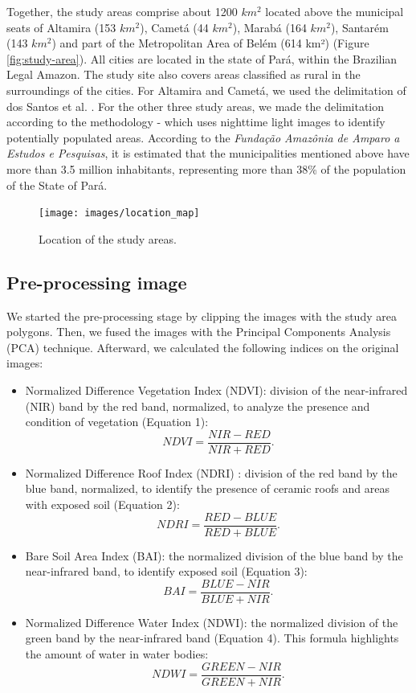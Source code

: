 \documentclass[preprint, 3p,
authoryear]{elsarticle} %
\providecommand{\tightlist}{%
  \setlength{\itemsep}{0pt}\setlength{\parskip}{0pt}}
\begin{document}
Together, the study areas comprise about 1200 \(km^2\) located above the
municipal seats of Altamira (153 \(km^2\)), Cametá (44 \(km^2\)), Marabá
(164 \(km^2\)), Santarém (143 \(km^2\)) and part of the Metropolitan
Area of Belém (614 km²) (Figure \ref{fig:study-area}). All cities are
located in the state of Pará, within the Brazilian Legal Amazon. The
study site also covers areas classified as rural in the surroundings of
the cities. For Altamira and Cametá, we used the delimitation of dos
Santos et al. \citeyearpar{Santos2022}. For the other three study areas,
we made the delimitation according to the methodology
\citep{Goncalves2021} - which uses nighttime light images to identify
potentially populated areas. According to the \emph{Fundação Amazônia de
Amparo a Estudos e Pesquisas}, it is estimated that the municipalities
mentioned above have more than 3.5 million inhabitants, representing
more than 38\% of the population of the State of Pará.

\begin{figure}
\texttt{[image: images/location\_map]} \caption{\label{fig:study-area}Location of the study areas.}\label{fig:fig-1}
\end{figure}

\hypertarget{pre-processing-image}{%
\subsection{Pre-processing image}\label{pre-processing-image}}

We started the pre-processing stage by clipping the images with the
study area polygons. Then, we fused the images with the Principal
Components Analysis (PCA) technique. Afterward, we calculated the
following indices on the original images:

\begin{itemize}
\tightlist
\item
  Normalized Difference Vegetation Index (NDVI): division of the
  near-infrared (NIR) band by the red band, normalized, to analyze the
  presence and condition of vegetation (Equation 1): \[ 
  NDVI = \frac{NIR - RED}{NIR + RED}.
  \]
\item
  Normalized Difference Roof Index (NDRI) \citep{Pinho2011}: division of
  the red band by the blue band, normalized, to identify the presence of
  ceramic roofs and areas with exposed soil (Equation 2): \[ 
  NDRI = \frac{RED - BLUE}{RED + BLUE}.
  \]
\item
  Bare Soil Area Index (BAI): the normalized division of the blue band
  by the near-infrared band, to identify exposed soil (Equation 3): \[ 
  BAI = \frac{BLUE - NIR}{BLUE + NIR}.
  \]
\item
  Normalized Difference Water Index (NDWI): the normalized division of
  the green band by the near-infrared band (Equation 4). This formula
  highlights the amount of water in water bodies: \[ 
  NDWI = \frac{GREEN - NIR}{GREEN + NIR}.
  \]
\end{itemize}
\end{document}
